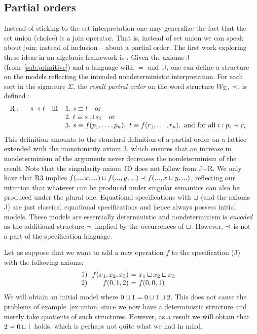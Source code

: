 {\subsection{Partial orders}\label{sub:PO} 
Instead of sticking to the set interpretation one may generalize 
the fact that the set union (choice) is a join 
operator. That is, instead of set union we can speak about join; instead 
of inclusion -- about a partial order. 
The first work exploring these ideas in an algebraic framework is \cite{c:77}. 
Given the axioms J (from~\ref{sub:primitive}) 
and a language with $=$ and $\sqcup$, one can define a structure on the models reflecting the intended 
nondeterministic interpretation. For each sort in the signature 
$\Sigma$, the {\em result partial order} on the word 
structure $W_{\Sigma}$, $\mathrel{\prec}$, is defined \cite{c:77, c:49}:
\[
\begin{array}{r@{\ \ \ \ \ }l@{\ \ }l}\label{def:R}
{\rm R:} & s \Incl t\ \ \ {\rm iff\ } & 1.\ s\syeq t\ \  {\rm\ or} \\
 & & 2.\ t \syeq s\ch s_{1}\ \ {\rm\ or} \\
 & & 3.\ s\syeq f(p_{1},\ldots,p_{n}),\ t\syeq 
 f(r_{1},\ldots,r_{n}),\ {\rm and\ for\ all\ } i : p_{i}\Incl r_{i}
 \end{array}
 \]
This definition amounts to the standard definition of a partial order on a lattice extended with the 
monotonicity axiom 3. which ensures that an increase in nondeterminism of the arguments never 
decreases the nondeterminism of the result. Note that the singularity axiom JD does not follow from J+R. 
We only have that R3 implies $f(...,x,...) \sqcup f(...,y,...) \mathrel{\prec} 
f(...,x\sqcup y,...)$, reflecting our intuition that whatever can 
be produced under singular semantics can also be produced under the plural one.
Equational specifications with $\sqcup$ (and the axioms J) are just classical equational specifications and 
hence always possess initial models. These models are essentially deterministic and nondeterminism is 
{\em encoded} as the additional structure $\mathrel{\prec}$ implied by the occurrences 
of $\sqcup$. However, $\mathrel{\prec}$ is not a part of the specification language. 

\begin{Example}\label{ex:collapse} 
Let us suppose that we want to add a new operation $f$ to the specification (J) with the following 
axioms:
\[ \begin{array}{l@{\ \ }r@{\ =\ }l}
	1) & f(x_{1},x_{2},x_{3}) &  x_{1}\ch x_{2}\ch x_{3} \\
	2) & f(0,1,2)  &  f(0,0,1)
\end{array}
\]
We will obtain an initial model where $0\sqcup 1 = 0\sqcup 1\sqcup 2$. This does not cause the problems of 
example~\ref{ex:union}
since we now have a deterministic structure and merely take quotients of such structures. 
However, as a result we will obtain that $2 \mathrel{\prec} 0\sqcup 1$ holds, which is perhaps not quite what we had in 
mind.
\end{Example}

}
